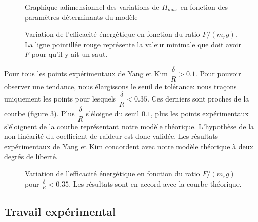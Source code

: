 \begin{figure}[htb]
\centering
\def\svgwidth{320}

\caption{Graphique adimensionnel des variations de $H_{max}$ en fonction des paramètres déterminants du modèle}
\label{fig:ykmae}
\end{figure}

\begin{figure}[htb]
\centering
\def\svgwidth{320}

\caption{Variation de l'efficacité énergétique en fonction du ratio $F/(m_r g)$. La ligne pointillée rouge représente la valeur minimale que doit avoir $F$ pour qu'il y ait un saut.}
\label{fig:yke}
\end{figure}

Pour tous les points expérimentaux de Yang et Kim $\dfrac{\delta}{R}>0.1$. Pour pouvoir observer une tendance, nous élargissons le seuil de tolérance: nous traçons uniquement les points pour lesquels $\dfrac{\delta}{R}<0.35$. Ces derniers sont proches de la courbe (figure \ref{fig:ytol}). Plus $\dfrac{\delta}{R}$ s'éloigne du seuil $0.1$, plus les points expérimentaux s'éloignent de la courbe représentant notre modèle théorique.
L'hypothèse de la non-linéarité du coefficient de raideur est donc validée. Les résultats expérimentaux de Yang et Kim concordent avec notre modèle théorique à deux degrés de liberté.

\begin{figure}[htb]
\centering
\def\svgwidth{320}

\caption{Variation de l'efficacité énergétique en fonction du ratio $F/(m_r g)$ pour $\frac{\delta}{R}<0.35$. Les résultats sont en accord avec la courbe théorique.}
\label{fig:ytol}
\end{figure}


\subsection{Travail expérimental}

